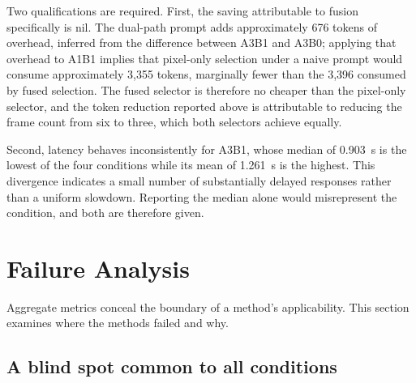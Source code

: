 Two qualifications are required. First, the saving attributable to fusion
specifically is nil. The dual-path prompt adds approximately 676 tokens of
overhead, inferred from the difference between A3B1 and A3B0; applying
that overhead to A1B1 implies that pixel-only selection under a naive
prompt would consume approximately 3{,}355 tokens, marginally fewer than
the 3{,}396 consumed by fused selection. The fused selector is therefore
no cheaper than the pixel-only selector, and the token reduction reported
above is attributable to reducing the frame count from six to three, which
both selectors achieve equally.

Second, latency behaves inconsistently for A3B1, whose median of
\SI{0.903}{\second} is the lowest of the four conditions while its mean of
\SI{1.261}{\second} is the highest. This divergence indicates a small
number of substantially delayed responses rather than a uniform slowdown.
Reporting the median alone would misrepresent the condition, and both are
therefore given.


\section{Failure Analysis}
\label{sec:failure}

Aggregate metrics conceal the boundary of a method's applicability. This
section examines where the methods failed and why.

\subsection{A blind spot common to all conditions}
\label{sec:failure-blindspot}

